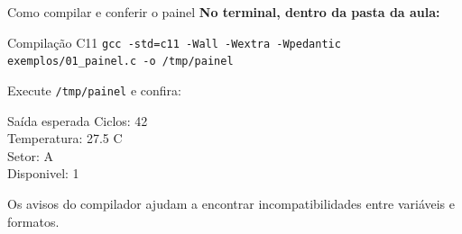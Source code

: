 \begin{frame}{Como compilar e conferir o painel}
\small
\textbf{No terminal, dentro da pasta da aula:}
\begin{block}{Compilação C11}
\texttt{gcc -std=c11 -Wall -Wextra -Wpedantic}\\
\texttt{exemplos/01\_painel.c -o /tmp/painel}
\end{block}
Execute \texttt{/tmp/painel} e confira:
\begin{exampleblock}{Saída esperada}
\ttfamily
Ciclos: 42\\
Temperatura: 27.5 C\\
Setor: A\\
Disponivel: 1
\end{exampleblock}
Os avisos do compilador ajudam a encontrar incompatibilidades entre variáveis e formatos.
\end{frame}
